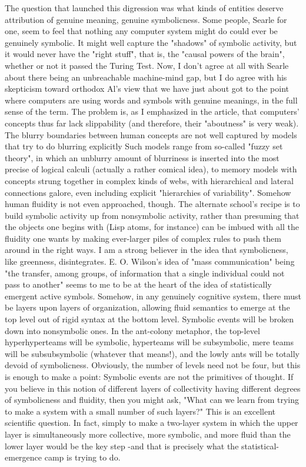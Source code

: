           The question that launched this digression was what kinds of entities deserve
attribution of genuine meaning, genuine symbolicness. Some people, Searle for one,
seem to feel that nothing any computer system might do could ever be genuinely
symbolic. It might well capture the "shadows" of symbolic activity, but it would never
have the "right stuff", that is, the "causal powers of the brain", whether or not it
passed the Turing Test. Now, I don't agree at all with Searle about there being an
unbreachable machine-mind gap, but I do agree with his skepticism toward orthodox
Al's view that we have just about got to the point where computers are using words
and symbols with genuine meanings, in the full sense of the term.
         The problem is, as I emphasized in the article, that computers' concepts thus
far lack slippability (and therefore, their "aboutness" is very weak). The blurry
boundaries between human concepts are not well captured by models that try to do
blurring explicitly Such models range from so-called "fuzzy set theory", in which an
unblurry amount of blurriness is inserted into the most precise of logical calculi
(actually a rather comical idea), to memory models with concepts strung together in
complex kinds of webs, with hierarchical and lateral connections galore, even
including explicit "hierarchies of variability". Somehow human fluidity is not even
approached, though.
         The alternate school's recipe is to build symbolic activity up from nonsymbolic
activity, rather than presuming that the objects one begins with (Lisp atoms, for
instance) can be imbued with all the fluidity one wants by making ever-larger piles of
complex rules to push them around in the right ways. I am a strong believer in the
idea that symbolicness, like greenness, disintegrates. E. O. Wilson's idea of "mass
communication" being "the transfer, among groups, of information that a single
individual could not pass to another" seems to me to be at the heart of the idea of
statistically emergent active symbols. Somehow, in any genuinely cognitive system,
there must be layers upon layers of organization, allowing fluid semantics to emerge
at the top level out of rigid syntax at the bottom level. Symbolic events will be broken
down into nonsymbolic ones. In the ant-colony metaphor, the top-level
hyperhyperteams will be symbolic, hyperteams will be subsymbolic, mere teams will
be subsubsymbolic (whatever that means!), and the lowly ants will be totally devoid
of symbolicness. Obviously, the number of levels need not be four, but this is enough
to make a point: Symbolic events are not the primitives of thought.
         If you believe in this notion of different layers of collectivity having different
degrees of symbolicness and fluidity, then you might ask, "What can we learn from
trying to make a system with a small number of such layers?" This is an excellent
scientific question. In fact, simply to make a two-layer system in which the upper
layer is simultaneously more collective, more symbolic, and more fluid than the lower
layer would be the key step -and that is precisely what the statistical-emergence camp
is trying to do.





